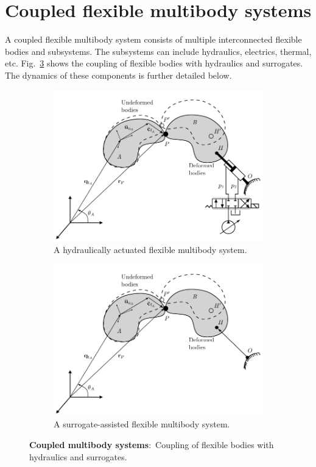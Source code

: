 \section{Coupled flexible multibody systems}
A coupled flexible multibody system consists of multiple interconnected flexible bodies and subsystems. The subsystems can include hydraulics, electrics, thermal, etc. Fig.~\ref{Fig01} shows the coupling of flexible bodies with hydraulics and surrogates. The dynamics of these components is further detailed below.
\begin{figure}[h]
    \centering
    \begin{subfigure}[b]{0.46\linewidth}
        \includegraphics[width=\linewidth]{Fig1A.pdf}
        \caption{A hydraulically actuated flexible multibody system.}
        \label{Fig01A}
    \end{subfigure}
    \hfill
    \begin{subfigure}[b]{0.46\linewidth}
        \includegraphics[width=\linewidth]{Fig1B.pdf}
        \caption{A surrogate-assisted flexible multibody system.}
        \label{Fig01B}
    \end{subfigure}
    \caption{\textbf{Coupled multibody systems}:~Coupling of flexible bodies with hydraulics and surrogates.}
    \label{Fig01}
\end{figure}
